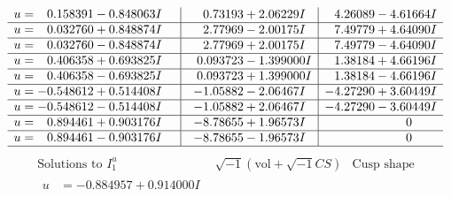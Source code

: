 \documentclass[1p]{elsarticle_modified}
\theoremstyle{definition}
\newcommand{\I}{\sqrt{-1}}
\begin{document}
$$\begin{array}{c|c|c}
\begin{aligned}
u &= \phantom{-}0.158391 - 0.848063 I\end{aligned}
 & \phantom{-}0.73193 + 2.06229 I & \phantom{-}4.26089 - 4.61664 I \\ \hline\begin{aligned}
u &= \phantom{-}0.032760 + 0.848874 I\end{aligned}
 & \phantom{-}2.77969 - 2.00175 I & \phantom{-}7.49779 + 4.64090 I \\ \hline\begin{aligned}
u &= \phantom{-}0.032760 - 0.848874 I\end{aligned}
 & \phantom{-}2.77969 + 2.00175 I & \phantom{-}7.49779 - 4.64090 I \\ \hline\begin{aligned}
u &= \phantom{-}0.406358 + 0.693825 I\end{aligned}
 & \phantom{-}0.093723 - 1.399000 I & \phantom{-}1.38184 + 4.66196 I \\ \hline\begin{aligned}
u &= \phantom{-}0.406358 - 0.693825 I\end{aligned}
 & \phantom{-}0.093723 + 1.399000 I & \phantom{-}1.38184 - 4.66196 I \\ \hline\begin{aligned}
u &= -0.548612 + 0.514408 I\end{aligned}
 & -1.05882 - 2.06467 I & -4.27290 + 3.60449 I \\ \hline\begin{aligned}
u &= -0.548612 - 0.514408 I\end{aligned}
 & -1.05882 + 2.06467 I & -4.27290 - 3.60449 I \\ \hline\begin{aligned}
u &= \phantom{-}0.894461 + 0.903176 I\end{aligned}
 & -8.78655 + 1.96573 I & \phantom{-0.000000 } 0 \\ \hline\begin{aligned}
u &= \phantom{-}0.894461 - 0.903176 I\end{aligned}
 & -8.78655 - 1.96573 I & \phantom{-0.000000 } 0\\
 \hline 
 \end{array}$$\newpage$$\begin{array}{c|c|c}  
\text{Solutions to }I^u_{1}& \I (\text{vol} + \sqrt{-1}CS) & \text{Cusp shape}\\
 \hline 
\begin{aligned}
u &= -0.884957 + 0.914000 I\end{aligned}

\end{array}$$
\end{document}
